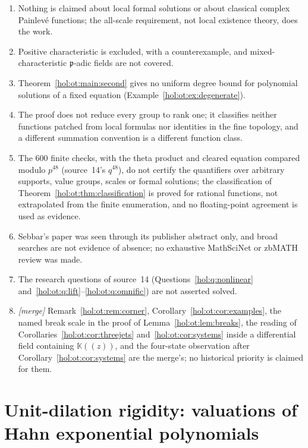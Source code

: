 \documentclass[11pt]{article}
\numberwithin{equation}{section}
\theoremstyle{definition}
\theoremstyle{remark}
\newcommand{\KK}{\mathbb K}
\begin{document}
\begin{enumerate}[label=\textup{(O\arabic*)}]
\item Nothing is claimed about local formal solutions or about classical
complex Painlev\'e functions; the all-scale requirement, not local existence
theory, does the work.
\item Positive characteristic is excluded, with a counterexample, and
mixed-characteristic $\mathfrak p$-adic fields are not covered.
\item Theorem~\ref{hol:ot:main:second} gives no uniform degree bound for
polynomial solutions of a fixed equation
(Example~\ref{hol:ot:ex:degenerate}).
\item The proof does not reduce every group to rank one; it classifies neither
functions patched from local formulas nor identities in the fine topology,
and a different summation convention is a different function class.
\item The 600 finite checks, with the theta product and cleared equation
compared modulo $p^{48}$ (source~14's $q^{48}$), do not certify the
quantifiers over arbitrary supports, value groups, scales or formal solutions;
the classification of Theorem~\ref{hol:ot:thm:classification} is proved for
rational functions, not extrapolated from the finite enumeration, and no
floating-point agreement is used as evidence.
\item Sebbar's paper was seen through its publisher abstract only, and broad
searches are not evidence of absence; no exhaustive MathSciNet or zbMATH
review was made.
\item The research questions of source~14
(Questions~\ref{hol:q:nonlinear} and~\ref{hol:ot:q:lift}--\ref{hol:ot:q:omnific})
are not asserted solved.
\item \emph{[merge]} Remark~\ref{hol:ot:rem:corner},
Corollary~\ref{hol:ot:cor:examples}, the named break scale in the proof of
Lemma~\ref{hol:ot:lem:breaks}, the reading of
Corollaries~\ref{hol:ot:cor:threejets} and~\ref{hol:ot:cor:systems} inside a
differential field containing $\KK((z))$, and the four-state observation after
Corollary~\ref{hol:ot:cor:systems} are the merge's; no historical priority is
claimed for them.
\end{enumerate}

\section{Unit-dilation rigidity: valuations of Hahn exponential polynomials}
\label{hol:ud:sec:setting}
\end{document}
